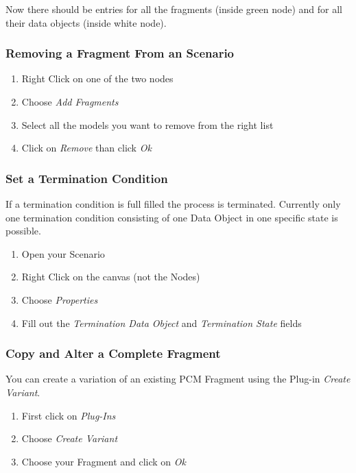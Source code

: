 Now there should be entries for all the fragments (inside green node)
and for all their data objects (inside white node).

%
%
\subsubsection{Removing a Fragment From an Scenario}
\label{removing-a-fragment-from-an-scenario}

\begin{enumerate}
\def\labelenumi{\arabic{enumi}.}
\itemsep1pt\parskip0pt
\item
  Right Click on one of the two nodes
\item
  Choose \emph{Add Fragments}
\item
  Select all the models you want to remove from the right list
\item
  Click on \emph{Remove} than click \emph{Ok}
\end{enumerate}

%
%
\subsubsection{Set a Termination Condition}
\label{set-a-termination-condition}

If a termination condition is full filled the process is terminated.
Currently only one termination condition consisting of one Data Object
in one specific state is possible.

\begin{enumerate}
\def\labelenumi{\arabic{enumi}.}
\itemsep1pt\parskip0pt
\item
  Open your Scenario
\item
  Right Click on the canvas (not the Nodes)
\item
  Choose \emph{Properties}
\item
  Fill out the \emph{Termination Data Object} and \emph{Termination
  State} fields
\end{enumerate}

%
%
\subsubsection{Copy and Alter a Complete Fragment}
\label{copy-and-alter-a-complete-fragment}

You can create a variation of an existing PCM Fragment using the Plug-in
\emph{Create Variant}.

\begin{enumerate}
\def\labelenumi{\arabic{enumi}.}
\itemsep1pt\parskip0pt
\item
  First click on \emph{Plug-Ins}
\item
  Choose \emph{Create Variant}
\item
  Choose your Fragment and click on \emph{Ok}
\end{enumerate}


%
%


%
%
